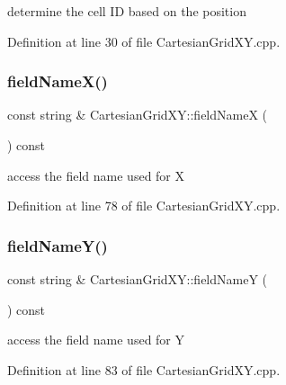 determine the cell ID based on the position 



Definition at line 30 of file Cartesian\+Grid\+X\+Y.\+cpp.

\hypertarget{class_d_d4hep_1_1_geometry_1_1_cartesian_grid_x_y_a569c1e0eaea5aad57e6578fd56acbd2b}{}\label{class_d_d4hep_1_1_geometry_1_1_cartesian_grid_x_y_a569c1e0eaea5aad57e6578fd56acbd2b} 
\subsubsection{\texorpdfstring{field\+Name\+X()}{fieldNameX()}}
{\footnotesize\ttfamily const string \& Cartesian\+Grid\+X\+Y\+::field\+NameX (\begin{DoxyParamCaption}{ }\end{DoxyParamCaption}) const}



access the field name used for X 



Definition at line 78 of file Cartesian\+Grid\+X\+Y.\+cpp.

\hypertarget{class_d_d4hep_1_1_geometry_1_1_cartesian_grid_x_y_a0e8cadbaedfd26563e15d5c6cd5bf148}{}\label{class_d_d4hep_1_1_geometry_1_1_cartesian_grid_x_y_a0e8cadbaedfd26563e15d5c6cd5bf148} 
\subsubsection{\texorpdfstring{field\+Name\+Y()}{fieldNameY()}}
{\footnotesize\ttfamily const string \& Cartesian\+Grid\+X\+Y\+::field\+NameY (\begin{DoxyParamCaption}{ }\end{DoxyParamCaption}) const}



access the field name used for Y 



Definition at line 83 of file Cartesian\+Grid\+X\+Y.\+cpp.

